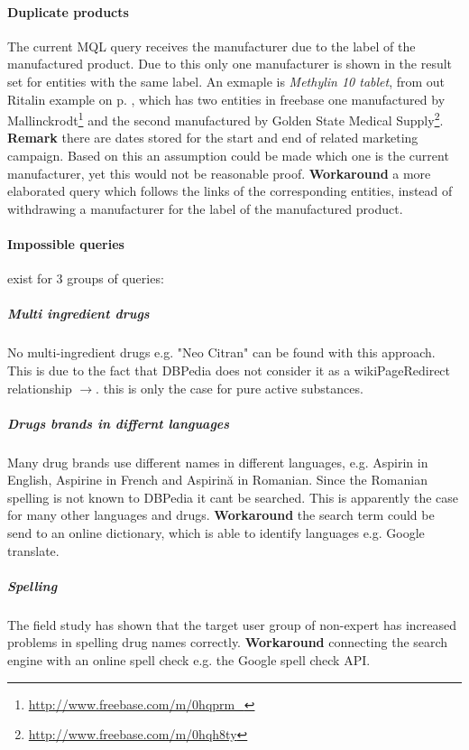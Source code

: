\documentclass[11pt,titlepage,oneside,openany]{book}
\begin{document}
\paragraph{Duplicate products}
\label{limitations:dubplicates} 
The current MQL query receives the manufacturer due to the label of the manufactured product. Due to this only one manufacturer is shown in the result set for entities with the same label. An exmaple is \textit{Methylin 10 tablet}, from out Ritalin example on  p. \pageref{example:ritalin}, which has two entities in freebase one manufactured by Mallinckrodt\footnote{\url{http://www.freebase.com/m/0hqprm_}} and the second manufactured by Golden State Medical Supply\footnote{\url{http://www.freebase.com/m/0hqh8ty}}. \textbf{Remark} there are dates stored for the start and end of related marketing campaign. Based on this an assumption could be made which one is the current manufacturer, yet this would not be reasonable proof. \textbf{Workaround} a more elaborated query which follows the links of the corresponding entities, instead of withdrawing a manufacturer for the label of the manufactured product.


\paragraph{Impossible queries} exist for 3 groups of queries:


\label{drug_cocktail}
\subparagraph{Multi ingredient drugs} No multi-ingredient drugs e.g. "Neo Citran" can be found with this approach. This is due to the fact that DBPedia does not consider it as a wikiPageRedirect relationship $\rightarrow$. this is only the case for pure active substances.

\subparagraph{Drugs brands in differnt languages}
\label{drug_foregin_name}
Many drug brands use different names in different languages, e.g. Aspirin in English, Aspirine in French and Aspirin\u{a} in Romanian. Since the Romanian spelling is not known to DBPedia it cant be searched. This is apparently the case for many other languages and drugs. \textbf{Workaround} the search term could be send to an online dictionary, which is able to identify languages e.g. Google translate.

\subparagraph{Spelling}
\label{drug_spellcheck}
The field study has shown that the target user group of non-expert has increased problems in spelling drug names correctly. \textbf{Workaround} connecting the search engine with an online spell check e.g. the Google spell check API.
\end{document}

